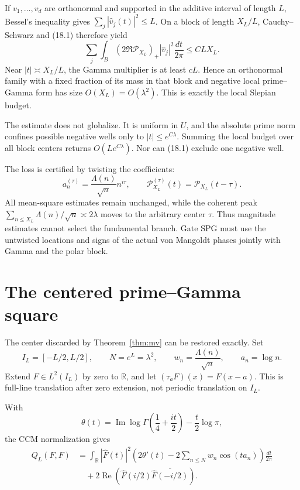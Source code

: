 \documentclass[11pt]{amsart}
\theoremstyle{definition}
\theoremstyle{remark}
\newcommand{\R}{\mathbb R}
\begin{document}
If \(v_1,\ldots,v_d\) are orthonormal and supported in the additive
interval of length \(L\), Bessel's inequality gives
\(\sum_j|\widehat v_j(t)|^2\le L\).  On a block of length \(X_L/L\),
Cauchy--Schwarz and (18.1) therefore yield
\[
 \sum_j\int_B(2\Re\mathcal P_{X_L})_+
       |\widehat v_j|^2\frac{dt}{2\pi}
 \le CLX_L.
 \tag{18.2}
\]
Near \(|t|\asymp X_L/L\), the Gamma multiplier is at least \(cL\).
Hence an orthonormal family with a fixed fraction of its mass in that block
and negative local prime--Gamma form has size \(O(X_L)=O(\lambda^2)\).
This is exactly the local Slepian budget.

The estimate does not globalize.  It is uniform in \(U\), and the absolute
prime norm confines possible negative wells only to
\(|t|\le e^{C\lambda}\).  Summing the local budget over all block centers
returns \(O(Le^{C\lambda})\).  Nor can (18.1) exclude one negative well.

The loss is certified by twisting the coefficients:
\[
 a_n^{(\tau)}=\frac{\Lambda(n)}{\sqrt n}n^{i\tau},
 \qquad
 \mathcal P_{X_L}^{(\tau)}(t)=\mathcal P_{X_L}(t-\tau).
\]
All mean-square estimates remain unchanged, while the coherent peak
\(\sum_{n\le X_L}\Lambda(n)/\sqrt n\asymp2\lambda\) moves to the arbitrary
center \(\tau\).  Thus magnitude estimates cannot select the fundamental
branch.  Gate SPG must use the untwisted locations and signs of the actual
von Mangoldt phases jointly with Gamma and the polar block.

\section{The centered prime--Gamma square}
\label{sec:centered-square}

The center discarded by Theorem~\ref{thm:mv} can be restored exactly.  Set
\[
 I_L=[-L/2,L/2],
 \qquad N=e^L=\lambda^2,
 \qquad w_n=\frac{\Lambda(n)}{\sqrt n},
 \qquad a_n=\log n.
\]
Extend \(F\in L^2(I_L)\) by zero to \(\R\), and let
\((\tau_aF)(x)=F(x-a)\).  This is full-line translation after zero
extension, not periodic translation on \(I_L\).

With
\[
 \theta(t)=
 \operatorname{Im}\log\Gamma\!\left(\frac14+\frac{it}{2}\right)
 -\frac t2\log\pi,
\]
the CCM normalization gives
\[
\begin{aligned}
 Q_L(F,F)
 &=
 \int_\R|\widehat F(t)|^2
 \left(
 2\theta'(t)-2\sum_{n\le N}w_n\cos(ta_n)
 \right)\frac{dt}{2\pi}\\
 &\quad+
 2\operatorname{Re}\!\left(
 \widehat F(i/2)\overline{\widehat F(-i/2)}
 \right).
\end{aligned}
\tag{19.1}
\]
\end{document}
